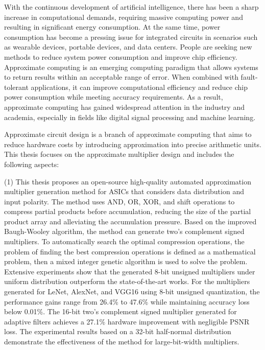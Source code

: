 \begin{abstract*}
      With the continuous development of artificial intelligence, there has been a sharp increase in computational demands, requiring massive computing power and resulting in significant energy consumption. At the same time, power consumption has become a pressing issue for integrated circuits in scenarios such as wearable devices, portable devices, and data centers. People are seeking new methods to reduce system power consumption and improve chip efficiency.
      Approximate computing is an emerging computing paradigm that allows systems to return results within an acceptable range of error. When combined with fault-tolerant applications, it can improve computational efficiency and reduce chip power consumption while meeting accuracy requirements. As a result, approximate computing has gained widespread attention in the industry and academia, especially in fields like digital signal processing and machine learning.
    
      Approximate circuit design is a branch of approximate computing that aims to reduce hardware costs by introducing approximation into precise arithmetic units. This thesis focuses on the approximate multiplier design and includes the following aspects:
    
      (1) This thesis proposes an open-source high-quality automated approximation multiplier generation method for ASICs that considers data distribution and input polarity. The method uses AND, OR, XOR, and shift operations to compress partial products before accumulation, reducing the size of the partial product array and alleviating the accumulation pressure. Based on the improved Baugh-Wooley algorithm, the method can generate two's complement signed multipliers. To 
      automatically search the optimal compression operations, the problem of finding the best compression operations is defined as a mathematical problem, then a mixed integer genetic algorithm is used to solve the problem. Extensive experiments show that the generated 8-bit unsigned multipliers under uniform distribution outperform the state-of-the-art works. For the multipliers generated for LeNet, AlexNet, and VGG16 using 8-bit unsigned quantization, the performance gains range from 26.4\% to 47.6\% while maintaining accuracy loss below 0.01\%. The 16-bit two's complement signed multiplier generated for adaptive filters achieves a 27.1\% hardware improvement with negligible PSNR loss. The experimental results based on a 32-bit half-normal distribution demonstrate the effectiveness of the method for large-bit-width multipliers.
    

\end{abstract*}
